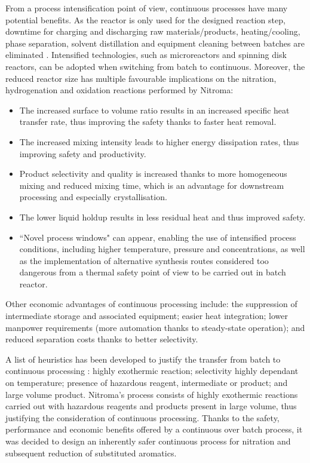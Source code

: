 From a process intensification point of view, continuous processes have many potential benefits. As the  reactor is only used for the designed reaction step, downtime for charging and discharging raw materials/products, heating/cooling, phase separation, solvent distillation and equipment cleaning between batches are eliminated \cite{randall_process_2020}. Intensified technologies, such as microreactors and spinning disk reactors, can be adopted when switching from batch to continuous. Moreover, the reduced reactor size has multiple favourable implications on the nitration, hydrogenation and oxidation reactions performed by Nitroma:
\begin{itemize}
    \item The increased surface to volume ratio results in an increased specific heat transfer rate, thus improving the safety thanks to faster heat removal.
    \item The increased mixing intensity leads to higher energy dissipation rates, thus improving safety and productivity.
    \item Product selectivity and quality is increased thanks to more homogeneous mixing and reduced mixing time, which is an advantage for downstream processing and especially crystallisation.
    \item The lower liquid holdup results in less residual heat and thus improved safety.
    \item ``Novel process windows" can appear, enabling the use of intensified process conditions, including higher temperature, pressure and concentrations, as well as the implementation of alternative synthesis routes considered too dangerous from a thermal safety point of view to be carried out in batch reactor.
\end{itemize}
Other economic advantages of continuous processing include: the suppression of intermediate storage and associated equipment; easier heat integration; lower manpower requirements (more automation thanks to steady-state operation); and reduced separation costs thanks to better selectivity.

A list of heuristics has been developed to justify the transfer from batch to continuous processing \cite{randall_process_2020}: highly exothermic reaction; selectivity highly dependant on temperature; presence of hazardous reagent, intermediate or product; and large volume product.
Nitroma's process consists of highly exothermic reactions carried out with hazardous reagents and products present in large volume, thus justifying the consideration of continuous processing. Thanks to the safety, performance and economic benefits offered by a continuous over batch process, it was decided to design an inherently safer continuous process for nitration and subsequent reduction of substituted aromatics.

